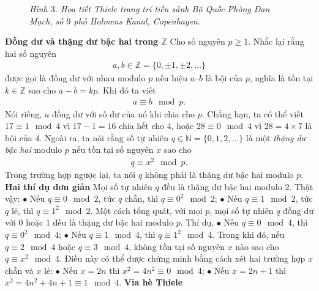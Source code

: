 \begin{multicols}{2}
\begin{figure}[H]
		\caption{\small\textit{\color{toanhocdoisong}Hình $3$. Họa tiết Thiele trang trí tiền sảnh Bộ Quốc Phòng Đan Mạch, số $9$ phố Holmens Kanal, Copenhagen.}}
		\vspace*{-10pt}
	\end{figure}
	\textbf{\color{toanhocdoisong}Đồng dư và thặng dư bậc hai trong $\pmb{\mathbb Z}$}
	\vskip 0.1cm
	Cho số nguyên $p \ge 1$. Nhắc lại rằng hai số nguyên
	\setlength{\abovedisplayskip}{5pt}
	\setlength{\belowdisplayskip}{5pt}
	\begin{align*}
		a, b \in \mathbb Z = \{ 0, \pm 1, \pm 2, \dots \}
	\end{align*}
	được gọi là đồng dư với nhau modulo $p$ nếu hiệu $a – b$ là bội của $p$, nghĩa là tồn tại $k \in \mathbb Z$ sao cho $a - b = kp$. Khi đó ta viết
	\begin{align*}
		a \equiv b \mod{p}.
	\end{align*}
	Nói riêng, $a$ đồng dư với số dư của nó khi chia cho $p$. Chẳng hạn, ta có thể viết $17 \equiv 1 \mod{4}$ vì $17 - 1 = 16$ chia hết cho $4$, hoặc $28 \equiv 0 \mod{4}$ vì $28 = 4 \times 7$ là bội của $4$.
	\vskip 0.1cm
	Ngoài ra, ta nói rằng số tự nhiên $q \in \mathbb N = \{ 0, 1, 2, \dots \}$ là một {\em thặng dư bậc hai} modulo $p$ nếu tồn tại số nguyên $x$ sao cho
	\begin{align*}
		q \equiv x^2 \mod{p}.
	\end{align*}
	Trong trường hợp ngược lại, ta nói $q$ không phải là thặng dư bậc hai modulo $p$.
	\vskip 0.2cm
	\textbf{\color{toanhocdoisong}Hai thí dụ đơn giản}
	\vskip 0.2cm
	Mọi số tự nhiên $q$ đều là thặng dư bậc hai modulo $2$. Thật vậy:
	\vskip 0.1cm
	$\bullet$	Nếu $q \equiv 0 \mod{2}$, tức $q$ chẵn, thì $q \equiv 0^2 \mod{2}$;
	\vskip 0.1cm
	$\bullet$	Nếu $q \equiv 1 \mod{2}$, tức $q$ lẻ, thì $q \equiv 1^2 \mod{2}$.
	Một cách tổng quát, với mọi $p$, mọi số tự nhiên $q$ đồng dư với $0$ hoặc $1$ đều là thặng dư bậc hai modulo $p$.
	\vskip 0.1cm
	Thí dụ,
	\vskip 0.1cm
	$\bullet$	Nếu $q \equiv 0 \mod{4}$, thì $q \equiv 0^2 \mod{4}$;
	\vskip 0.1cm
	$\bullet$	Nếu $q \equiv 1 \mod{4}$, thì $q \equiv 1^2 \mod{4}$.
	\vskip 0.1cm
	Trong khi đó, nếu $q \equiv 2 \mod{4}$ hoặc $q \equiv 3 \mod{4}$, không tồn tại số nguyên $x$ nào sao cho $q \equiv x^2 \mod{4}$. Điều này có thể được chứng minh bằng cách xét hai trường hợp $x$ chẵn và $x$ lẻ:
	\vskip 0.1cm
	$\bullet$	Nếu $x = 2n$ thì $x^2 = 4 n^2 \equiv 0 \mod{4}$;
	\vskip 0.2cm
	$\bullet$	Nếu $x = 2n + 1$ thì $x^2 = 4 n^2 + 4n + 1 \equiv 1 \mod{4}$.
	\vskip 0.2cm
	\textbf{\color{toanhocdoisong}Vỉa hè Thiele}
	\vskip 0.2cm

\end{multicols}

